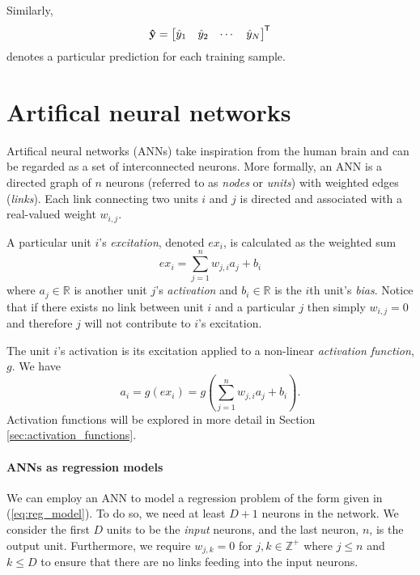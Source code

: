 Similarly,
\begin{equation}
    \label{eq:sup_learn_prediction}
    \mathbf{\hat{y}} = \begin{bmatrix}
        \hat{y}_1 & \hat{y}_2 & \cdots & \hat{y}_N
    \end{bmatrix}^{\mkern-1.5mu\mathsf{T}}
\end{equation}
denotes a particular prediction for each training sample.

\section{Artifical neural networks}
Artifical neural networks (ANNs) take inspiration from the human brain and can be regarded as a set of interconnected neurons. 
More formally, an ANN is a directed graph of $n$ neurons (referred to as \textit{nodes} or \textit{units}) with weighted edges (\textit{links}).
Each link connecting two units $i$ and $j$ is directed and associated with a real-valued weight $w_{i,j}$. 

A particular unit $i$'s \textit{excitation}, denoted ${ex}_i$, is calculated as the weighted sum
\begin{equation}
    {ex}_i = \sum_{j=1}^n{w_{j,i} a_j} + b_i
\end{equation}
where $a_j \in \mathbb{R}$ is another unit $j$'s \textit{activation} and $b_i \in \mathbb{R}$ is the $i$th unit's \textit{bias}.
Notice that if there exists no link between unit $i$ and a particular $j$ then simply $w_{i,j}=0$ and therefore $j$ will not contribute to $i$'s excitation. 

The unit $i$'s activation is its excitation applied to a non-linear \textit{activation function}, $g$. We have
\begin{equation}
    \label{eq:ann_activation}
    a_i = g\left({ex}_i\right) = g\left(\sum_{j=1}^n{w_{j,i} a_j} + b_i\right).
\end{equation}
Activation functions will be explored in more detail in Section \ref{sec:activation_functions}. 


\paragraph{ANNs as regression models}
We can employ an ANN to model a regression problem of the form given in (\ref{eq:reg_model}). 
To do so, we need at least $D+1$ neurons in the network. 
We consider the first $D$ units to be the \textit{input} neurons, and the last neuron, $n$, is the output unit.
Furthermore, we require $w_{j,k}=0$ for $j,k \in \mathbb{Z}^+$ where $j \leq n$ and $k \leq D$ to ensure that there are no links feeding into the input neurons.

